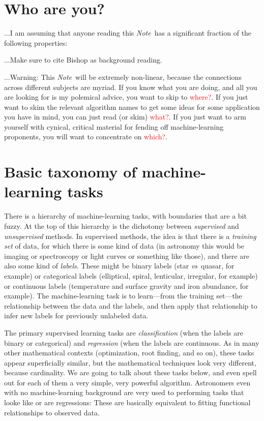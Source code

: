 \documentclass[12pt, letterpaper]{article}
\newcommand{\documentname}{\textsl{Note}}
\newcommand{\foreign}[1]{\textsl{#1}}
\newcommand{\vs}{\foreign{vs}}
\newcommand{\todo}[1]{\textcolor{red}{#1}}  %
\begin{document}
\section{Who are you?}

...I am assuming that anyone reading this \documentname\ has a
significant fraction of the following properties:

...Make sure to cite Bishop as background reading.

...Warning: This \documentname\ will be extremely non-linear, because
the connections across different subjects are myriad. If you know what
you are doing, and all you are looking for is my polemical advice, you
want to skip to \todo{where?}. If you just want to skim the relevant
algorithm names to get some ideas for some application you have in
mind, you can just read (or skim) \todo{what?}. If you just want to arm
yourself with cynical, critical material for fending off machine-learning
proponents, you will want to concentrate on \todo{which?}.

\section{Basic taxonomy of machine-learning tasks}

There is a hierarchy of machine-learning tasks, with boundaries that
are a bit fuzzy.
At the top of this hierarchy is the dichotomy between \emph{supervised}
and \emph{unsupervised} methods.
In supervised methods, the idea is that there is a \emph{training set}
of data, for which there is some kind of data (in astronomy this would
be imaging or spectroscopy or light curves or something like those),
and there are also some kind of \emph{labels}.
These might be binary labels (star \vs\ quasar, for example) or
categorical labels (elliptical, spiral, lenticular, irregular, for
example) or continuous labels (temperature and surface gravity and
iron abundance, for example).
The machine-learning task is to learn---from the training set---the
relationship between the data and the labels, and then apply that
relationship to infer new labels for previously unlabeled data.

The primary supervised learning tasks are \emph{classification} (when
the labels are binary or categorical) and \emph{regression} (when the
labels are continuous.
As in many other mathematical contexts (optimization, root finding,
and so on), these tasks appear superficially similar, but the mathematical
techniques look very different, because cardinality.
We are going to talk about these tasks below, and even spell out for
each of them a very simple, very powerful algorithm.
Astronomers even with no machine-learning background are very used
to performing tasks that looke like or are regressions:
These are basically equivalent to fitting functional relationships to
observed data.
\end{document}
